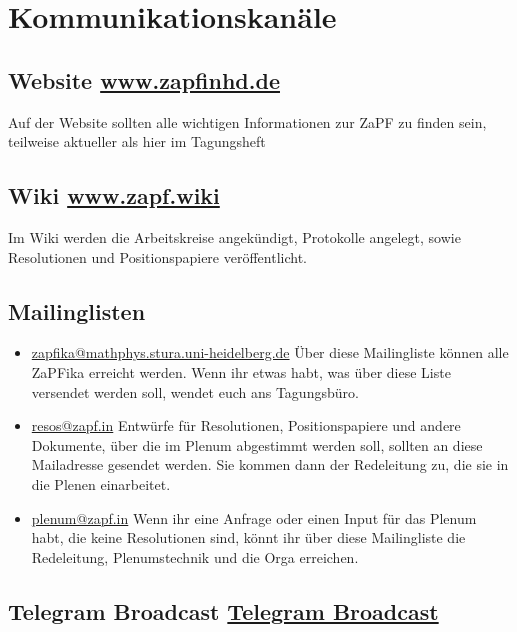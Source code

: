 
\section{Kommunikationskanäle}

\subsection{Website \hfill \url{www.zapfinhd.de}}

\noindent Auf der Website sollten alle wichtigen Informationen zur ZaPF zu finden sein, teilweise aktueller als hier im Tagungsheft

\subsection{Wiki \hfill \url{www.zapf.wiki}}

\noindent Im Wiki werden die Arbeitskreise angekündigt, Protokolle angelegt, sowie Resolutionen und Positionspapiere veröffentlicht.

\subsection{Mailinglisten}

\begin{itemize}%
\item[\faEnvelope] \url{zapfika@mathphys.stura.uni-heidelberg.de} Über diese Mailingliste können alle ZaPFika erreicht werden. Wenn ihr etwas habt, was über diese Liste versendet werden soll, wendet euch ans Tagungsbüro.

\item[\faEnvelope] \url{resos@zapf.in} Entwürfe für Resolutionen, Positionspapiere und andere Dokumente, über die im Plenum abgestimmt werden soll, sollten an diese Mailadresse gesendet werden. Sie kommen dann der Redeleitung zu, die sie in die Plenen einarbeitet.

\item[\faEnvelope] \url{plenum@zapf.in}  Wenn ihr eine Anfrage oder einen Input für das Plenum habt, die keine Resolutionen sind, könnt ihr über diese Mailingliste die Redeleitung, Plenumstechnik und die Orga erreichen.

\end{itemize}

\subsection{Telegram Broadcast \hfill \url{Telegram Broadcast}} %

